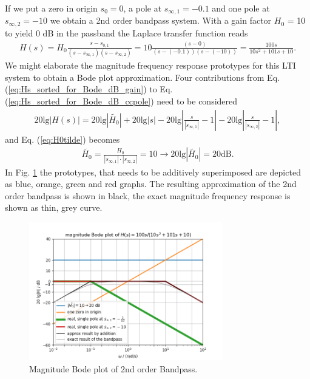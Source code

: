 \documentclass[a4paper,11pt,oneside]{scrartcl}
\newcommand{\eq}[1]{Eq. (\ref{#1})}
\begin{document}
If we put a zero in origin $s_0=0$, a pole at $s_{\infty,1}=-0.1$ and one
pole at $s_{\infty,2}=-10$ we obtain a 2nd order bandpass system.
With a gain factor $H_0$ = 10 to yield 0 dB in the passband
the Laplace transfer function reads
\begin{align}
H(s) = H_0\frac{s-s_{0,1}}{(s-s_{\infty,1})(s-s_{\infty,2})} = 10\frac{(s-0)}{(s-(-0.1))(s-(-10))}
=\frac{100 s}{10 s^2 + 101 s + 10}.
\end{align}
%
We might elaborate the magnitude frequency response prototypes for this
LTI system to obtain a Bode plot approximation.
%
Four contributions from \eq{eq:Hs_sorted_for_Bode_dB_gain} to \eq{eq:Hs_sorted_for_Bode_dB_ccpole} need to be considered
\begin{align}
20\mathrm{lg}|H(s)| = 20\mathrm{lg}|\tilde{H_0}| + 20\mathrm{lg}|s| - 20\mathrm{lg}|\frac{s}{|s_{\infty,1}|}-1|
- 20\mathrm{lg}|\frac{s}{|s_{\infty,2}|}-1|,
\end{align}
and \eq{eq:H0tilde} becomes
\begin{align}
\tilde{H_0} = \frac{H_0}{|s_{\infty,1}| \cdot |s_{\infty,2}|} = 10 \rightarrow 20\mathrm{lg}|\tilde{H_0}| = 20 \mathrm{dB}.
\end{align}
In Fig. \ref{fig:fig_bode_mag_bandpass_example} the prototypes, that needs to be additively superimposed are depicted as blue, orange, green and red graphs.
The resulting approximation of the 2nd order bandpass is shown in black, the exact magnitude frequency response is shown as thin, grey curve.
\begin{figure}[h!]
\centering
\includegraphics[width=0.75\textwidth]{fig_bode_mag_bandpass_example}
\caption{Magnitude Bode plot of 2nd order Bandpass.}
\label{fig:fig_bode_mag_bandpass_example}
\end{figure}





\end{document}
